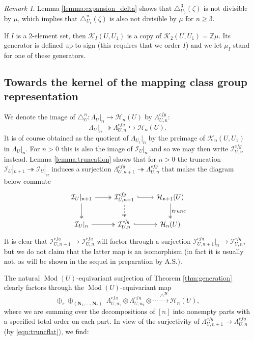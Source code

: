 \documentclass[12pt,letterpaper]{amsart}
\numberwithin{equation}{section}
\def\Nbold{{\mathbf N}}
\def\ZZ{{\mathbb Z}}
\def\tri{\triangle}
\def\Hcal{{\mathcal H}}
\def\Ical{{\mathcal I}}
\def\Kcal{{\mathcal K}}
\newcommand\cfg{\mathit{cfg}}
\newcommand\Mod{\operatorname{Mod}}
\theoremstyle{remark}
\newtheorem{remark}[theorem]{Remark}
\begin{document}
\begin{remark}\label{rem:}
Lemma \ref{lemma:expansion_delta} shows that  $\tri^3_{U_1}(\zeta)$  is not divisible by $\mu$, which implies that $\tri^n_{U_1}(\zeta)$ is also not divisible by $\mu$ for $n\ge 3$.
\end{remark}



If $I$ is a $2$-element set, then $\Kcal_I(U, U_1)$ is a copy of $\Kcal_2(U, U_1)=\ZZ\mu$. Its generator is defined up to sign (this requires that we order $I$) and  we let $\mu_I$ stand for one of these generators.




\subsection{Towards the  kernel of the mapping class group representation} 
We  denote  the image of $\tri^n_U:  \Lambda_{U}|_n\to \Hcal_n(U)$ by $\Lambda^\cfg_{U,n}$:
\begin{equation}\label{eqn:flatquotient}
\Lambda_{U}|_n\twoheadrightarrow  \Lambda^\cfg_{U,n}\hookrightarrow \Hcal_n(U).
\end{equation}
It is of course  obtained  as the quotient of $\Lambda_{U_1}|_n$ by the  preimage of $\Kcal_n(U, U_1)$ in  $\Lambda_{U}|_n$.  For $n>0$ this is also the image of $\Ical_U|_n$ and so we may then write $\Ical^\cfg_{U,n}$ instead.
 Lemma \ref{lemma:truncation} shows that  for  $n>0$
the truncation $\Ical_{U}|_{n+1}\twoheadrightarrow \Ical_{U}|_{n}$ induces a surjection $\Lambda^\cfg_{U,n+1}\twoheadrightarrow \Lambda^\cfg_{U,n}$ that makes the  diagram  below commute
\begin {equation}\label{eqn:truncflat}
    \begin{tikzcd}
    \Ical_{U}|_{n+1}\dar[two heads]\rar[two heads] &\Ical^\cfg_{U,n+1}\dar[dashed,two heads]\rar[hook] & \Hcal_{n+1}(U)\dar[two heads,"trunc "]\\
    \Ical_{U}|_n\rar[two heads] &   \Ical^\cfg_{U,n}\rar[hook]  &\Hcal_n(U)
\end{tikzcd}
\end{equation}
It is clear that $\Ical^\cfg_{U,n+1}\to  \Ical^\cfg_{U,n}$ will factor through a surjection  
$\Ical^\cfg_{U,n+1}|_n \to \Ical^\cfg_{U,n}$, but we do not claim that the latter map is an isomorphism (in fact it is usually not,  as will be shown in
the sequel in preparation by A.S.).

The natural  $\Mod(U)$-equivariant surjection of Theorem \ref{thm:generation} clearly factors through the $\Mod(U)$-equivariant map
\begin{equation}\label{eqn:tensormap3}
\oplus_r\oplus_{(\Nbold_1,\dots , \Nbold_r)} \;  \Lambda^\cfg_{U,n_1}\otimes\Lambda^\cfg_{U,n_2}\otimes\cdots  \xrightarrow{\tri^{\Nbold}} \Hcal_n(U),
\end{equation}
where we are summing over the decompositions of $[n]$ into nonempty parts with a specified total order on each part.
In view of the surjectivity of $\Lambda^\cfg_{U,n+1}\to\Lambda^\cfg_{U,n}$ (by \eqref{eqn:truncflat}), we find:
\end{document}

